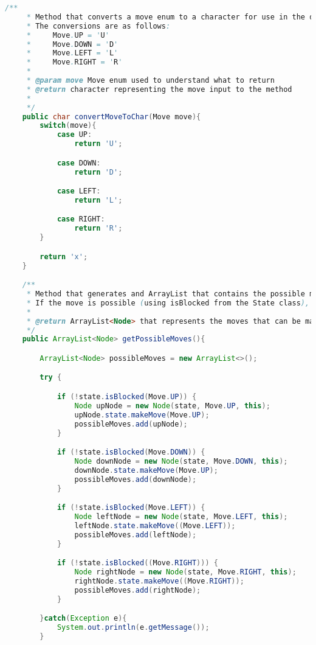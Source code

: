 \documentclass[a4paper, 11pt]{article} %
\begin{document}
\begin{lstlisting}[language=java]
    /**
     * Method that converts a move enum to a character for use in the displayPathTaken() method.
     * The conversions are as follows:
     *     Move.UP = 'U'
     *     Move.DOWN = 'D'
     *     Move.LEFT = 'L'
     *     Move.RIGHT = 'R'
     *
     * @param move Move enum used to understand what to return
     * @return character representing the move input to the method
     *
     */
    public char convertMoveToChar(Move move){
        switch(move){
            case UP:
                return 'U';

            case DOWN:
                return 'D';

            case LEFT:
                return 'L';

            case RIGHT:
                return 'R';
        }

        return 'x';
    }

    /**
     * Method that generates and ArrayList that contains the possible moves that can be made from the current Node
     * If the move is possible (using isBlocked from the State class), then a node is generated and added to the ArrayList.
     *
     * @return ArrayList<Node> that represents the moves that can be made from the current Node
     */
    public ArrayList<Node> getPossibleMoves(){

        ArrayList<Node> possibleMoves = new ArrayList<>();

        try {

            if (!state.isBlocked(Move.UP)) {
                Node upNode = new Node(state, Move.UP, this);
                upNode.state.makeMove(Move.UP);
                possibleMoves.add(upNode);
            }

            if (!state.isBlocked(Move.DOWN)) {
                Node downNode = new Node(state, Move.DOWN, this);
                downNode.state.makeMove(Move.UP);
                possibleMoves.add(downNode);
            }

            if (!state.isBlocked(Move.LEFT)) {
                Node leftNode = new Node(state, Move.LEFT, this);
                leftNode.state.makeMove((Move.LEFT));
                possibleMoves.add(leftNode);
            }

            if (!state.isBlocked((Move.RIGHT))) {
                Node rightNode = new Node(state, Move.RIGHT, this);
                rightNode.state.makeMove((Move.RIGHT));
                possibleMoves.add(rightNode);
            }

        }catch(Exception e){
            System.out.println(e.getMessage());
        }


\end{lstlisting}
\end{document}
